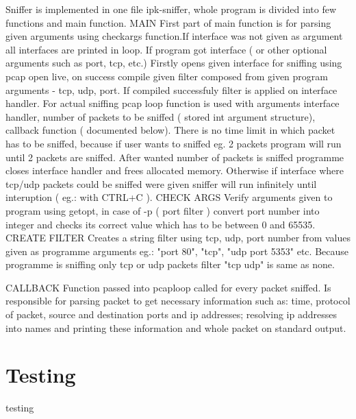 \documentclass{article}
\begin{document}
Sniffer is implemented in one file ipk-sniffer, whole program is divided into few functions and main function. \newline
MAIN
First part of main function is for parsing given arguments using check\textunderscore args function.If interface was not given as argument all interfaces are printed in loop.
	If program got interface ( or other optional arguments such as port, tcp, etc.) 
	Firstly opens given interface for sniffing using pcap \textunderscore open \textunderscore live, on success compile given filter composed from given program arguments - tcp, udp, port. If compiled successfuly filter is applied on interface handler.
	For actual sniffing pcap \textunderscore loop function is used with arguments interface handler, number of packets to be sniffed ( stored int argument structure), callback function ( documented below). There is no time limit in which packet has to be sniffed, because if user wants to sniffed eg. 2 packets program will run until 2 packets are sniffed.  After wanted number of packets is sniffed programme closes interface handler and frees allocated memory. Otherwise if interface where tcp/udp packets could be sniffed were given sniffer will run infinitely until interuption ( eg.: with CTRL+C ).\newline
CHECK \textunderscore ARGS
Verify arguments given to program using getopt, in case of -p ( port filter ) convert port number into integer and checks its correct value which has to be between 0 and 65535. \newline
CREATE \textunderscore FILTER
Creates a string filter using tcp, udp, port number from values given as programme arguments eg.: "port 80", "tcp", "udp port 5353" etc. Because programme is sniffing only tcp or udp packets filter "tcp udp" is same as none.\newline

CALLBACK\newline
Function passed into pcaploop called for every packet sniffed. Is responsible for parsing packet to get necessary information such as: time, protocol of packet, source and destination ports and ip addresses; resolving ip addresses into names and printing these information and whole packet on standard output.



	\section{Testing}
	testing
	

	
	

	
\end{document}
